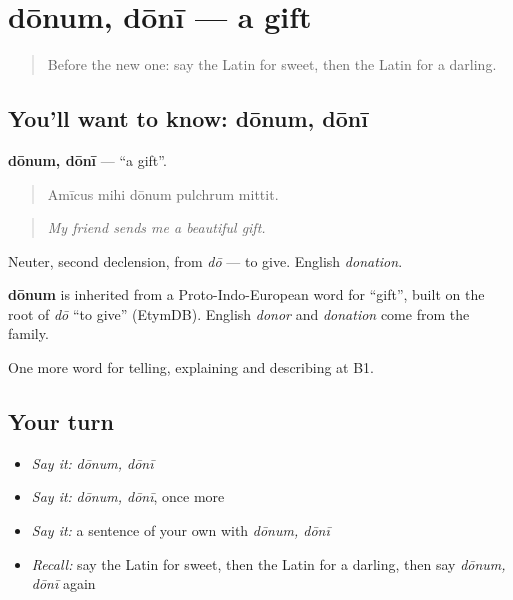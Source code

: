 \section[dōnum, dōnī]{dōnum, dōnī — a gift}

\label{lesson:LA-C536-donum}



\begin{quote}
Before the new one: say the Latin for sweet, then the Latin for a darling.
\end{quote}

\subsection*{You'll want to know: dōnum, dōnī}
\textbf{dōnum, dōnī} — \textquotedblleft{}a gift\textquotedblright{}.

\begin{quote}
Amīcus mihi dōnum pulchrum mittit.
\end{quote}

\begin{quote}
\emph{My friend sends me a beautiful gift.}
\end{quote}

Neuter, second declension, from \emph{dō} — to give. English \emph{donation}.

\begin{cousinweb}
\textbf{dōnum} is inherited from a Proto-Indo-European word for \textquotedblleft{}gift\textquotedblright{}, built on the root of \emph{dō} \textquotedblleft{}to give\textquotedblright{} (EtymDB). English \emph{donor} and \emph{donation} come from the family.
\end{cousinweb}

\begin{grammarlens}[title={What you've built}]
One more word for telling, explaining and describing at B1.
\end{grammarlens}

\subsection*{Your turn}
\begin{itemize}
\raggedright
  \item \emph{Say it:} \emph{dōnum, dōnī}
  \item \emph{Say it:} \emph{dōnum, dōnī}, once more
  \item \emph{Say it:} a sentence of your own with \emph{dōnum, dōnī}
  \item \emph{Recall:} say the Latin for sweet, then the Latin for a darling, then say \emph{dōnum, dōnī} again
\end{itemize}

